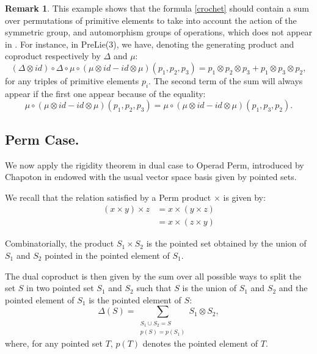 \documentclass[11pt,leqno]{amsart}
\theoremstyle{definition}
\newtheorem{remark}[definition]{Remark}
\theoremstyle{plain}
\begin{document}
\begin{remark}
This example shows that the formula \eqref{crochet} should contain a sum over permutations of primitive elements to take into account the action of the symmetric group, and automorphism groups of operations, which does not appear in \cite{GBO}. For instance, in PreLie(3), we have, denoting the generating product and coproduct respectively by $\Delta$ and $\mu$:
\begin{equation*}
(\Delta \otimes id) \circ \Delta \circ \mu \circ \left( \mu \otimes id - id \otimes \mu \right) (p_1, p_2, p_3) = p_1 \otimes p_2 \otimes p_3 + p_1 \otimes p_3 \otimes p_2,
\end{equation*}
for any triples of primitive elements $p_i$. The second term of the sum will always appear if the first one appear because of the equality:
\begin{equation*}
\mu \circ \left( \mu \otimes id - id \otimes \mu \right) (p_1, p_2, p_3) = \mu \circ \left( \mu \otimes id - id \otimes \mu \right) (p_1, p_3, p_2).
\end{equation*}
\end{remark}


\subsection{Perm Case.}

We now apply the rigidity theorem in dual case to Operad Perm, introduced by Chapoton in \cite{Perm2} endowed with the usual vector space basis given by pointed sets. 

We recall that the relation satisfied by a Perm product $\times$ is given by: 
\begin{align*}
(x \times y) \times z &= x \times (y \times z) \\
&= x \times (z \times y)
\end{align*}

Combinatorially, the product $S_1 \times S_2$ is the pointed set obtained by the union of $S_1$ and $S_2$ pointed in the pointed element of $S_1$.

The dual coproduct is then given by the sum over all possible ways to split the set $S$ in two pointed set $S_1$ and $S_2$ such that $S$ is the union of $S_1$ and $S_2$ and the pointed element of $S_1$ is the pointed element of $S$:
\begin{equation*}
\Delta(S)=\sum_{\substack{S_1 \cup S_2 = S \\ p(S) = p(S_1)}} S_1  \otimes S_2,
\end{equation*}
where, for any pointed set $T$, $p(T)$ denotes the pointed element of $T$.
\end{document}
